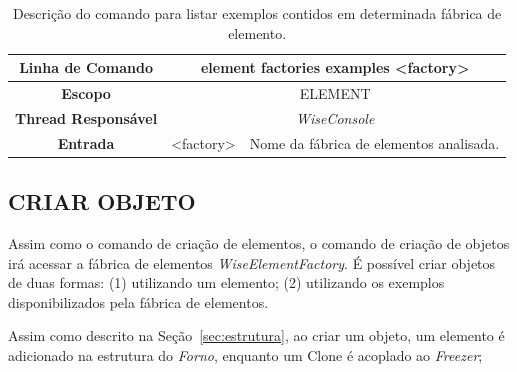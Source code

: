 \begin{center}
	\begin{table}[!htbp]
		\begin{tabularx}{\textwidth}{c|c|X}
			\toprule
			\textbf{Linha de Comando} & \multicolumn{2}{c}{element factories examples <factory>} \\
			\midrule
			\textbf{Escopo} & \multicolumn{2}{c}{ELEMENT} \\
			\hline
			\textbf{Thread Responsável} & \multicolumn{2}{c}{\textit{WiseConsole}} \\
			\hline
			\textbf{Entrada} & <factory> & Nome da fábrica de elementos analisada. \\
			\bottomrule
		\end{tabularx}
		\caption{Descrição do comando para listar exemplos contidos em determinada fábrica de elemento.}
		\label{tab:list_element_ex_factories}
	\end{table}
\end{center}

\subsection{CRIAR OBJETO}\label{sec:create_object}

Assim como o comando de criação de elementos, o comando de criação de objetos irá acessar a fábrica de elementos \textit{WiseElementFactory}. É possível criar objetos de duas formas: (1) utilizando um elemento; (2) utilizando os exemplos disponibilizados pela fábrica de elementos.

Assim como descrito na Seção~\ref{sec:estrutura}, ao criar um objeto, um elemento é adicionado na estrutura do \textit{Forno}, enquanto um Clone é acoplado ao \textit{Freezer};

